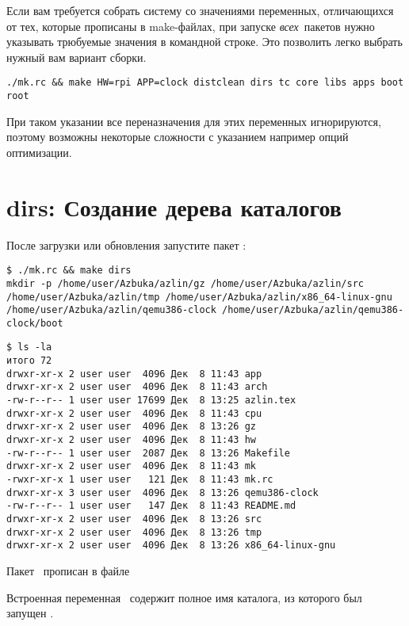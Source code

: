 Если вам требуется собрать систему со значениями переменных, отличающихся от
тех, которые прописаны в make-файлах, при запуске \emph{всех}\ пакетов нужно
указывать трюбуемые значения в командной строке. Это позволить легко выбрать
нужный вам вариант сборки.

\begin{verbatim}
./mk.rc && make HW=rpi APP=clock distclean dirs tc core libs apps boot root 
\end{verbatim}

При таком указании все переназначения для этих переменных игнорируются, поэтому
возможны некоторые сложности с указанием например опций оптимизации.

\section{dirs: Создание дерева каталогов}

После загрузки или обновления запустите пакет :

\begin{verbatim}
$ ./mk.rc && make dirs
mkdir -p /home/user/Azbuka/azlin/gz /home/user/Azbuka/azlin/src 
/home/user/Azbuka/azlin/tmp /home/user/Azbuka/azlin/x86_64-linux-gnu 
/home/user/Azbuka/azlin/qemu386-clock /home/user/Azbuka/azlin/qemu386-clock/boot
\end{verbatim}
\begin{verbatim}
$ ls -la
итого 72
drwxr-xr-x 2 user user  4096 Дек  8 11:43 app
drwxr-xr-x 2 user user  4096 Дек  8 11:43 arch
-rw-r--r-- 1 user user 17699 Дек  8 13:25 azlin.tex
drwxr-xr-x 2 user user  4096 Дек  8 11:43 cpu
drwxr-xr-x 2 user user  4096 Дек  8 13:26 gz
drwxr-xr-x 2 user user  4096 Дек  8 11:43 hw
-rw-r--r-- 1 user user  2087 Дек  8 13:26 Makefile
drwxr-xr-x 2 user user  4096 Дек  8 11:43 mk
-rwxr-xr-x 1 user user   121 Дек  8 11:43 mk.rc
drwxr-xr-x 3 user user  4096 Дек  8 13:26 qemu386-clock
-rw-r--r-- 1 user user   147 Дек  8 11:43 README.md
drwxr-xr-x 2 user user  4096 Дек  8 13:26 src
drwxr-xr-x 2 user user  4096 Дек  8 13:26 tmp
drwxr-xr-x 2 user user  4096 Дек  8 13:26 x86_64-linux-gnu
\end{verbatim}

Пакет \ прописан в файле


Встроенная переменная \ содержит полное имя каталога, из которого был
запущен .

